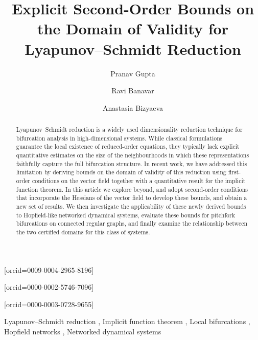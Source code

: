 \documentclass[a4paper]{cas-dc}
\begin{document}
\let\WriteBookmarks\relax
\def\floatpagepagefraction{1}
\def\textpagefraction{.001}

\title[mode=title]{Explicit Second-Order Bounds on the Domain of Validity for Lyapunov--Schmidt Reduction}

\author[1,2]{Pranav Gupta}[orcid=0009-0004-2965-8196]
\cormark[1]

\author[1]{Ravi Banavar}[orcid=0000-0002-5746-7096]

\author[2]{Anastasia Bizyaeva}[orcid=0000-0003-0728-9655]



\begin{keywords}
    Lyapunov--Schmidt reduction \sep
    Implicit function theorem \sep
    Local bifurcations \sep
    Hopfield networks \sep
    Networked dynamical systems
\end{keywords}

\begin{abstract}
    Lyapunov--Schmidt reduction is a widely used dimensionality reduction technique for bifurcation analysis in high-dimensional systems. While classical formulations guarantee the local existence of reduced-order equations, they typically lack explicit quantitative estimates on the size of the neighbourhoods in which these representations faithfully capture the full bifurcation structure. In recent work, we have addressed this limitation by deriving bounds on the domain of validity of this reduction using first-order conditions on the vector field together with a quantitative result for the implicit function theorem. In this article we explore beyond, and adopt second-order conditions that incorporate the Hessians of the vector field to develop these bounds, and obtain a new set of results. We then investigate the applicability of these newly derived bounds to Hopfield-like networked dynamical systems, evaluate these bounds for pitchfork bifurcations on connected regular graphs, and finally examine the relationship between the two certified domains for this class of systems.
\end{abstract}
\end{document}
